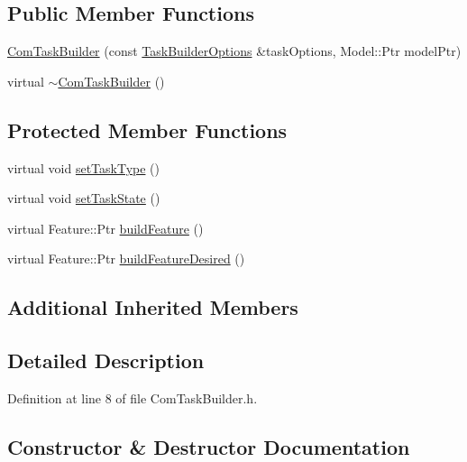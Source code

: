 \subsection*{Public Member Functions}
\begin{DoxyCompactItemize}
\item 
\hyperlink{classocra_1_1ComTaskBuilder_aa3cffa7682c1122e7e5bfa533a66f9bc}{Com\+Task\+Builder} (const \hyperlink{classocra_1_1TaskBuilderOptions}{Task\+Builder\+Options} \&task\+Options, Model\+::\+Ptr model\+Ptr)
\item 
virtual \hyperlink{classocra_1_1ComTaskBuilder_a17a4747e20d9e37f734a9f27820d068d}{$\sim$\+Com\+Task\+Builder} ()
\end{DoxyCompactItemize}
\subsection*{Protected Member Functions}
\begin{DoxyCompactItemize}
\item 
virtual void \hyperlink{classocra_1_1ComTaskBuilder_af9cfac995156297324ccbee1900f891c}{set\+Task\+Type} ()
\item 
virtual void \hyperlink{classocra_1_1ComTaskBuilder_ab514d4644f7dfeec3ae84a5b0b8bbc34}{set\+Task\+State} ()
\item 
virtual Feature\+::\+Ptr \hyperlink{classocra_1_1ComTaskBuilder_aa4e0d21159da91788a1d2806ddca84da}{build\+Feature} ()
\item 
virtual Feature\+::\+Ptr \hyperlink{classocra_1_1ComTaskBuilder_abdd4c74539a37ff4c719c0ac78812bf4}{build\+Feature\+Desired} ()
\end{DoxyCompactItemize}
\subsection*{Additional Inherited Members}


\subsection{Detailed Description}


Definition at line 8 of file Com\+Task\+Builder.\+h.



\subsection{Constructor \& Destructor Documentation}
